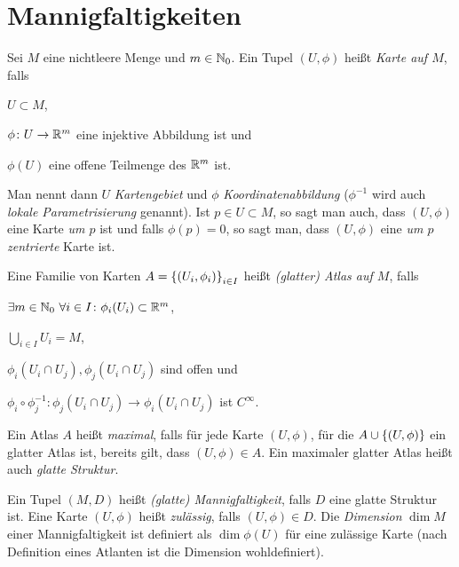 \section{Mannigfaltigkeiten}
\label{sec:mfk}

\begin{definition}
  Sei $M$ eine nichtleere Menge und $m\in\mathbb{N}_0$. Ein Tupel $(U,\phi)$ heißt \emph{Karte auf
    $M$}, falls
  \begin{properties}
  \item $U \subset M$,
  \item $\phi\colon U \to \mathbb{R}^m$ eine injektive Abbildung ist und
  \item $\phi(U)$ eine offene Teilmenge des $\mathbb{R}^m$ ist.
  \end{properties}
  Man nennt dann $U$ \emph{Kartengebiet} und $\phi$
  \emph{Koordinatenabbildung} ($\phi^{-1}$ wird auch \emph{lokale
  Parametrisierung} genannt). Ist $p\in U \subset M$, so sagt man
auch, dass $(U,\phi)$ eine Karte \emph{um $p$} ist und falls $\phi(p)
= 0$, so sagt man, dass $(U,\phi)$ eine \emph{um $p$ zentrierte} Karte ist. 

  Eine Familie von Karten $A = \left\lbrace (U_i,\phi_i) \right\rbrace_{i\in  I}$ heißt
  \emph{(glatter) Atlas auf $M$}, falls
  \begin{properties}
  \item $\exists m \in \mathbb{N}_0\ \forall i\in I\colon \phi_i(U_i) \subset \mathbb{R}^m$,
  \item $\bigcup_{i\in I} U_i = M$,
  \item $\phi_i(U_i\cap U_j), \phi_j(U_i\cap U_j)$ sind offen und
  \item $\phi_i\circ \phi_j^{-1} \colon \phi_j(U_i\cap U_j) \to
    \phi_i(U_i\cap U_j)$ ist $C^\infty$.
  \end{properties}

  Ein Atlas $A$ heißt \emph{maximal}, falls für jede Karte $(U,\phi)$,
  für die $A\cup \left\lbrace (U,\phi) \right\rbrace$ ein glatter Atlas ist, bereits gilt, dass
  $(U,\phi) \in A$. Ein maximaler glatter Atlas heißt auch
  \emph{glatte Struktur}.

  Ein Tupel $(M,D)$ heißt \emph{(glatte) Mannigfaltigkeit}, falls $D$
  eine glatte Struktur ist. Eine Karte $(U,\phi)$ heißt \emph{zulässig},
  falls $(U,\phi)\in D$. Die \emph{Dimension} $\dim M$ einer
  Mannigfaltigkeit ist definiert als $\dim \phi(U)$ für eine zulässige
  Karte (nach Definition eines Atlanten ist die Dimension wohldefiniert). 
\end{definition}

